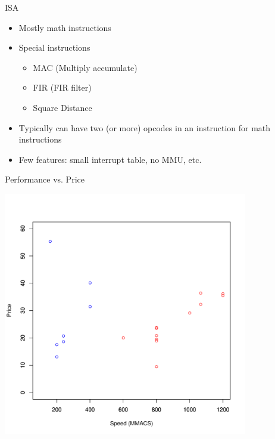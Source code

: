 \documentclass{beamer}
\begin{document}
\begin{frame}{ISA}
    \begin{itemize}
        \item Mostly math instructions
        \item Special instructions
            \begin{itemize}
                \item MAC (Multiply accumulate)
                \item FIR (FIR filter)
                \item Square Distance
            \end{itemize}
        \item Typically can have two (or more) opcodes in an instruction for
            math instructions
        \item Few features: small interrupt table, no MMU, etc.
    \end{itemize}
\end{frame}

\begin{frame}{Performance vs. Price}
    \begin{center}
        \includegraphics[width=0.8\textwidth]{price_perf.pdf}
    \end{center}
\end{frame}
\end{document}
